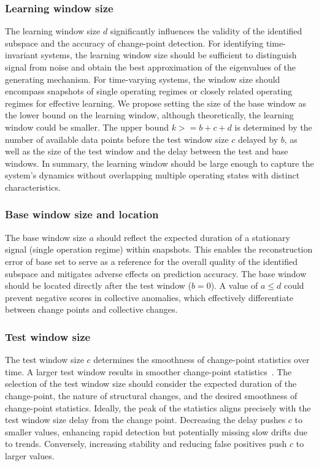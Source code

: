 \subsubsection{Learning window size}
The learning window size \(d\) significantly influences the validity of the identified subspace and the accuracy of change-point detection. For identifying time-invariant systems, the learning window size should be sufficient to distinguish signal from noise and obtain the best approximation of the eigenvalues of the generating mechanism. For time-varying systems, the window size should encompass snapshots of single operating regimes or closely related operating regimes for effective learning. We propose setting the size of the base window as the lower bound on the learning window, although theoretically, the learning window could be smaller. The upper bound \(k >= b + c + d\) is determined by the number of available data points before the test window size \(c\) delayed by \(b\), as well as the size of the test window and the delay between the test and base windows. In summary, the learning window should be large enough to capture the system's dynamics without overlapping multiple operating states with distinct characteristics.

\subsubsection{Base window size and location}
The base window size \(a\) should reflect the expected duration of a stationary signal (single operation regime) within snapshots. This enables the reconstruction error of base set to serve as a reference for the overall quality of the identified subspace and mitigates adverse effects on prediction accuracy. The base window should be located directly after the test window (\(b = 0\)). A value of \(a \leq d\) could prevent negative scores in collective anomalies, which effectively differentiate between change points and collective changes.

\subsubsection{Test window size}
The test window size \(c\) determines the smoothness of change-point statistics over time. A larger test window results in smoother change-point statistics~\citep{Moskvina2003}. The selection of the test window size should consider the expected duration of the change-point, the nature of structural changes, and the desired smoothness of change-point statistics. Ideally, the peak of the statistics aligns precisely with the test window size delay from the change point. Decreasing the delay pushes \(c\) to smaller values, enhancing rapid detection but potentially missing slow drifts due to trends. Conversely, increasing stability and reducing false positives push \(c\) to larger values.

